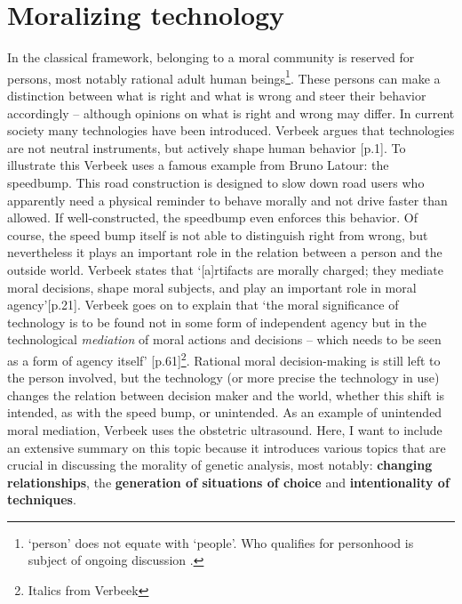 \section{Moralizing technology} \label{Moralizing}
In the classical framework, belonging to a moral community is reserved for persons, most notably rational adult human beings\footnote{‘person’ does not equate with ‘people’. Who qualifies for personhood is subject of ongoing discussion \cite{White_2013}.}. 
These persons can make a distinction between what is right and what is wrong and steer their behavior accordingly – although opinions on what is right and wrong may differ. 
In current society many technologies have been introduced. Verbeek argues that technologies are not neutral instruments, but actively shape human behavior \cite{Verbeek_2011}[p.1].
To illustrate this Verbeek uses a famous example from Bruno Latour: the speedbump. 
This road construction is designed to slow down road users who apparently need a physical reminder to behave morally and not drive faster than allowed. 
If well-constructed, the speedbump even enforces this behavior. Of course, the speed bump itself is not able to distinguish right from wrong, but nevertheless it plays an important role in the relation between a person and the outside world. 
Verbeek states that ‘[a]rtifacts are morally charged; they mediate moral decisions, shape moral subjects, and play an important role in moral agency’[p.21]. 
Verbeek goes on to explain that ‘the moral significance of technology is to be found not in some form of independent agency but in the technological \textsl{mediation} of moral actions and decisions – which needs to be seen as a form of agency itself’ [p.61]\footnote{Italics from Verbeek}. 
Rational moral decision-making is still left to the person involved, but the technology (or more precise the technology in use) changes the relation between decision maker and the world, whether this shift is intended, as with the speed bump, or unintended. 
As an example of unintended moral mediation, Verbeek uses the obstetric ultrasound. 
Here, I want to include an extensive summary on this topic because it introduces various topics that are crucial in discussing the morality of genetic analysis, most notably: \textbf{changing relationships}, the \textbf{generation of situations of choice} and \textbf{intentionality of techniques}.

